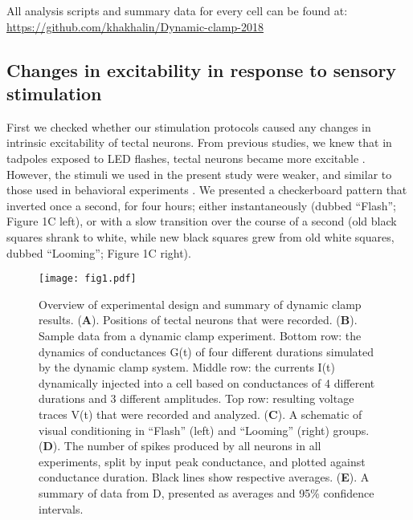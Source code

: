\documentclass{article}
\begin{document}
All analysis scripts and summary data for every cell can be found at:  \url{https://github.com/khakhalin/Dynamic-clamp-2018}

\subsection*{Changes in excitability in response to sensory stimulation}

First we checked whether our stimulation protocols caused any changes in intrinsic excitability of tectal neurons. From previous studies, we knew that in tadpoles exposed to LED flashes, tectal neurons became more excitable \citep{aizenman2003,ciarleglio2015}. However, the stimuli we used in the present study were weaker, and similar to those used in behavioral experiments \citep{khakhalin2014,james2015,truszkowski2017}. We presented a checkerboard pattern that inverted once a second, for four hours; either instantaneously (dubbed “Flash”; Figure 1C left), or with a slow transition over the course of a second (old black squares shrank to white, while new black squares grew from old white squares, dubbed “Looming”; Figure 1C right).

\begin{figure*}
\texttt{[image: fig1.pdf]}
\caption{
Overview of experimental design and summary of dynamic clamp results. (\textbf{A}). Positions of tectal neurons that were recorded. (\textbf{B}). Sample data from a dynamic clamp experiment. Bottom row: the dynamics of conductances G(t) of four different durations simulated by the dynamic clamp system. Middle row: the currents I(t) dynamically injected into a cell based on conductances of 4 different durations and 3 different amplitudes. Top row: resulting voltage traces V(t) that were recorded and analyzed. (\textbf{C}). A schematic of visual conditioning in “Flash” (left) and “Looming” (right) groups. (\textbf{D}). The number of spikes produced by all neurons in all experiments, split by input peak conductance, and plotted against conductance duration. Black lines show respective averages. (\textbf{E}). A summary of data from D, presented as averages and 95\% confidence intervals.}
\end{figure*}
\end{document}
